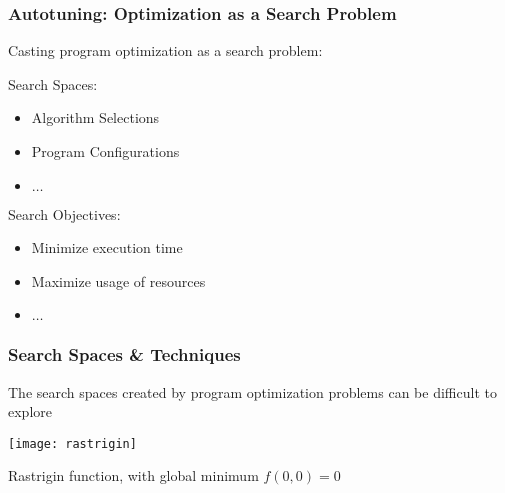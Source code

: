 \documentclass[10pt, compress, aspectratio=169]{beamer}
\begin{document}
\begin{frame}
    \frametitle{Autotuning: Optimization as a Search Problem}
    Casting \alert{program optimization} as a \alert{search problem}:

    \alert{Search Spaces}:
    \begin{itemize}
        \item Algorithm Selections
        \item Program Configurations
        \item $\dots$
    \end{itemize}

    \alert{Search Objectives}:
    \begin{itemize}
        \item Minimize \alert{execution time}
        \item Maximize \alert{usage of resources}
        \item $\dots$
    \end{itemize}
\end{frame}

\begin{frame}
    \frametitle{Search Spaces \& Techniques}
    The \alert{search spaces} created by program optimization problems can be
    \alert{difficult to explore}

    \begin{center}
        \texttt{[image: rastrigin]}

        Rastrigin function, with \alert{global minimum} $f(0,0) = 0$
    \end{center}
\end{frame}
\end{document}
